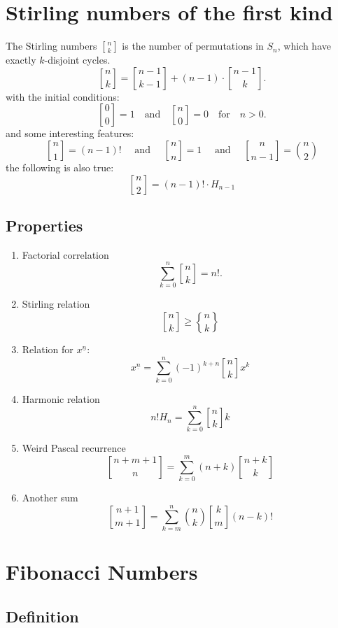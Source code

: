 \documentclass{article}
\begin{document}
\section{Stirling numbers of the first kind}

The Stirling numbers \(\genfrac[]{0pt}{1}{n}{k}\) is the number of permutations in \(S_n\), which have exactly $k$-disjoint cycles.
\[
\genfrac[]{0pt}{0}{n}{k}= \genfrac[]{0pt}{0}{n-1}{k-1} + (n-1)\cdot \genfrac[]{0pt}{0}{n-1}{k}.
\]
with the initial conditions:
\[
\genfrac[]{0pt}{0}{0}{0} = 1 \quad \text{and} \quad \genfrac[]{0pt}{0}{n}{0} = 0 \quad \text{for} \quad n > 0.
\]
and some interesting features:
\[
\genfrac[]{0pt}{0}{n}{1} = (n-1)! \quad \text{ and } \quad \genfrac[]{0pt}{0}{n}{n} = 1 \quad \text{ and } \quad \genfrac[]{0pt}{0}{n}{n-1} = \binom{n}{2}
\]
the following is also true:
\[
\genfrac[]{0pt}{0}{n}{2} = (n-1)!\cdot H_{n-1}
\]

\subsection{Properties}

\begin{enumerate}
    \item Factorial correlation
    \[
    \sum_{k=0}^n \genfrac[]{0pt}{0}{n}{k} = n!.
    \]
    \item Stirling relation
    \[
    \genfrac[]{0pt}{0}{n}{k} \geq \genfrac\{\}{0pt}{0}{n}{k}
    \]
    \item Relation for $x^{\underline{n}}$:
    \[
    x^{\underline{n}} = \sum_{k=0}^{n} (-1)^{k+n} \genfrac[]{0pt}{0}{n}{k} x^k
    \]
    \item Harmonic relation
    \[
    n! H_{n} = \sum_{k=0}^{n} \genfrac[]{0pt}{0}{n}{k} k
    \]
    \item Weird Pascal recurrence
    \[
    \genfrac[]{0pt}{0}{n+m+1}{n} = \sum_{k=0}^{m} (n+k) \genfrac[]{0pt}{0}{n+k}{k}
    \]
    \item Another sum
    \[
    \genfrac[]{0pt}{0}{n+1}{m+1} = \sum_{k=m}^{n} \binom{n}{k}\genfrac[]{0pt}{0}{k}{m} (n-k)!
    \]
\end{enumerate}

\section{Fibonacci Numbers}

\subsection{Definition}
\end{document}
